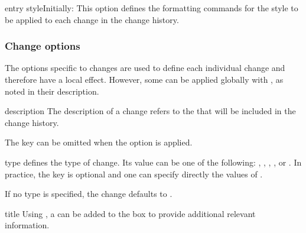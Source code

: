 \documentclass[11pt, outdir = ./out]{article}
\begin{document}
\begin{Optiondef}{entry style}{}{Initially: }
    This option defines the formatting commands for the style to be applied to each change in the change history.
\end{Optiondef}

\subsubsection{Change options}\label{sec:change-options}

The options specific to changes are used to define each individual change and therefore have a local effect. However, some can be applied globally with , as noted in their description.

\begin{Optiondef}{description}{}{}
    The description of a change refers to the  that will be included in the change history.

    The  key can be omitted when the  option is applied.
\end{Optiondef}

\begin{Optiondef}{type}{}{}
     defines the type of change. Its value can be one of the following: , , , , or . In practice, the key  is optional and one can specify directly the values of .

    If no type is specified, the change defaults to .
\end{Optiondef}

\begin{DocsListing}
\end{DocsListing}

\begin{Optiondef}{title}{}{}
    Using , a  can be added to the box to provide additional relevant information.
\end{Optiondef}
\end{document}
